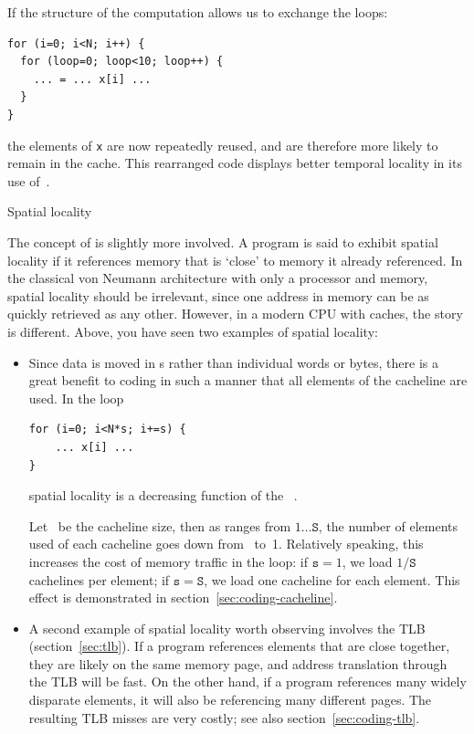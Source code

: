 If the structure of the computation allows us to exchange
the loops:
\begin{verbatim}
for (i=0; i<N; i++) {
  for (loop=0; loop<10; loop++) {
    ... = ... x[i] ...
  }
}
\end{verbatim}
the elements of \texttt{x} are now repeatedly reused, and are
therefore more likely to remain in the cache. This rearranged code
displays better
temporal locality in its use of~.

 {Spatial locality}

The concept of  is slightly more
involved. A program is said to exhibit spatial locality if it
references memory that is `close' to memory it already referenced. In
the classical von Neumann architecture with only a processor and
memory, spatial locality should be irrelevant, since one address in
memory can be as quickly  retrieved as any other. However, in a modern \ac{CPU}
with caches, the story is different. Above, you have seen two examples
of spatial locality:
\begin{itemize}
\item Since data is moved in s rather than
  individual words or bytes,
  there is a great benefit to coding in such a manner that all
  elements of the cacheline are used. In the loop
\begin{verbatim}
for (i=0; i<N*s; i+=s) {
    ... x[i] ...
}
\end{verbatim}
  spatial locality is a decreasing function of the
  ~.

  Let ~be the cacheline size, then as  ranges from $1\ldots\mathtt{S}$,
  the number of elements used of each cacheline goes
  down from~ to~1. Relatively speaking, this increases the cost
  of memory traffic in the loop: if $\mathtt{s}=1$, we load $1/\mathtt{S}$ cachelines
  per element; if $\mathtt{s}=\mathtt{S}$, we load one cacheline for each element. This
  effect is demonstrated in section~\ref{sec:coding-cacheline}.
\item A second example of spatial locality worth observing involves
  the \ac{TLB} (section~\ref{sec:tlb}). If a program references
  elements that are close together, they are likely on the same memory
  page, and address translation through the TLB will be fast. On the
  other hand, if a program references many widely disparate elements,
  it will also be referencing many different pages. The resulting TLB
  misses are very costly; see also section~\ref{sec:coding-tlb}.
\end{itemize}

